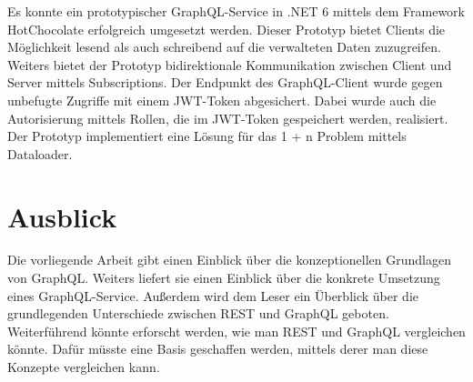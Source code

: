 Es konnte ein prototypischer GraphQL-Service in .NET 6 mittels dem Framework HotChocolate erfolgreich umgesetzt werden.
Dieser Prototyp bietet Clients die Möglichkeit lesend als auch schreibend auf die verwalteten Daten zuzugreifen.
Weiters bietet der Prototyp bidirektionale Kommunikation zwischen Client und Server mittels Subscriptions.
Der Endpunkt des GraphQL-Client wurde gegen unbefugte Zugriffe mit einem JWT-Token abgesichert.
Dabei wurde auch die Autorisierung mittels Rollen, die im JWT-Token gespeichert werden, realisiert.
Der Prototyp implementiert eine Lösung für das 1 + n Problem mittels Dataloader.

\section{Ausblick}
Die vorliegende Arbeit gibt einen Einblick über die konzeptionellen Grundlagen von GraphQL.
Weiters liefert sie einen Einblick über die konkrete Umsetzung eines GraphQL-Service.
Außerdem wird dem Leser ein Überblick über die grundlegenden Unterschiede zwischen REST und GraphQL geboten.
Weiterführend könnte erforscht werden, wie man REST und GraphQL vergleichen könnte.
Dafür müsste eine Basis geschaffen werden, mittels derer man diese Konzepte vergleichen kann.